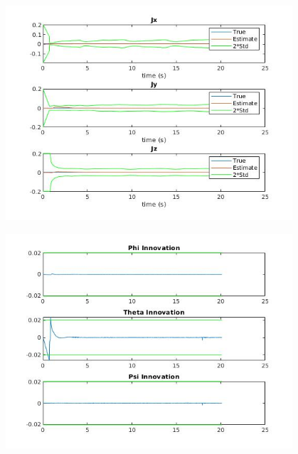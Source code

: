 \documentclass[10pt]{beamer}
\begin{document}
\begin{frame}
\includegraphics[width=0.8\textwidth,height=0.8\textheight]{Parameters}
\end{frame}

\begin{frame}
\includegraphics[width=0.8\textwidth,height=0.8\textheight]{innovation}
\end{frame}
\end{document}
